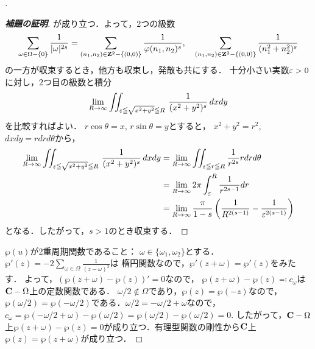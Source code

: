 \begin{proof}[\pfb]
\begin{proof}[\textbf{補題の証明}]
        が成り立つ．よって，2つの級数
        \begin{align*}
            \sum_{\omega\in\Omega-\{0\}}\frac{1}{|\omega|^{2s}}
            =\sum_{(n_1,n_2)\in\mathbf{Z}^2-\{(0,0)\}}\frac{1}{\varphi(n_1,n_2)^s},\quad
            \sum_{(n_1,n_2)\in\mathbf{Z}^2-\{(0,0)\}}\frac{1}{(n_1^2+n_2^2)^s}
        \end{align*}
        の一方が収束するとき，他方も収束し，発散も共にする．
        十分小さい実数$\varepsilon>0$に対し，2つ目の級数と積分
        \begin{align*}
            \lim_{R\to\infty}\iint_{\varepsilon\leqq\sqrt{x^2+y^2}\leqq R}\,\frac{1}{(x^2+y^2)^s}\,dxdy
        \end{align*}
        を比較すればよい．
        $r\cos\theta=x$, $r\sin\theta=y$とすると，
        $x^2+y^2=r^2$, $dxdy=rdrd\theta$から，
        \begin{align*}
            \lim_{R\to\infty}\iint_{\varepsilon\leqq\sqrt{x^2+y^2}\leqq R}\,\frac{1}{(x^2+y^2)^s}\,dxdy
            &=
            \lim_{R\to\infty}
            \iint_{\varepsilon\leqq r\leqq R}\frac{1}{r^{2s}}rdrd\theta\\
            &=
            \lim_{R\to\infty} 2\pi\int_{\varepsilon}^{R}\frac{1}{r^{2s-1}}dr\\
            &=
            \lim_{R\to\infty}\frac{\pi}{1-s}\left(\frac{1}{R^{2(s-1)}}-\frac{1}{\varepsilon^{2(s-1)}}\right)
        \end{align*}
        となる．したがって，$s>1$のとき収束する．
    \end{proof}


    $\wp(u)$が2重周期関数であること：
    $\omega\in\{\omega_1,\omega_2\}$とする．$\wp'(z)=-2\sum_{\omega\in\Omega}\frac{1}{(z-\omega)^3}$は
    楕円関数なので，$\wp'(z+\omega)=\wp'(z)$をみたす．
    よって，$(\wp(z+\omega)-\wp(z))'=0$なので，
    $\wp(z+\omega)-\wp(z)\eqqcolon c_{\omega}$は$\mathbf{C}-\Omega$上の定数関数である．
    $\omega/2\notin\Omega$であり，$\wp(z)=\wp(-z)$なので，
    $\wp(\omega/2)=\wp(-\omega/2)$である．$\omega/2=-\omega/2+\omega$なので，
    $c_\omega=\wp(-\omega/2+\omega)-\wp(\omega/2)=\wp(\omega/2)-\wp(\omega/2)=0$. 
    したがって，$\mathbf{C}-\Omega$上$\wp(z+\omega)-\wp(z)=0$が成り立つ．有理型関数の剛性から$\mathbf{C}$上$\wp(z)=\wp(z+\omega)$が成り立つ．
\end{proof}
